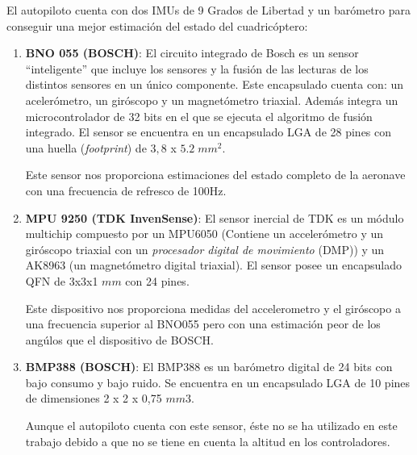 El autopiloto cuenta con dos IMUs de 9 Grados de Libertad y un barómetro para conseguir una mejor estimación del estado del cuadricóptero:

\begin{enumerate}
	\item \textbf{BNO 055 (BOSCH)}: El circuito integrado de Bosch es un sensor ``inteligente'' que incluye los sensores y la fusión de las lecturas de los distintos sensores en un único componente. Este encapsulado cuenta con: un acelerómetro, un giróscopo y un magnetómetro triaxial. Además integra un microcontrolador de 32 bits en el que se ejecuta el algoritmo de fusión integrado. El sensor se encuentra en un encapsulado LGA de 28 pines con una huella (\textit{footprint}) de $3,8$ x $5.2\; mm^2$.
	
	Este sensor nos proporciona estimaciones del estado completo de la aeronave con una frecuencia de refresco de 100Hz. 
	
	\item \textbf{MPU 9250 (TDK InvenSense)}: El sensor inercial de TDK es un módulo multichip compuesto por un MPU6050 (Contiene un accelerómetro y un giróscopo triaxial con un \textit{procesador digital de movimiento} (DMP)) y un  AK8963 (un magnetómetro digital triaxial). El sensor posee un encapsulado QFN de 3x3x1 $mm$ con 24 pines.
	
	Este dispositivo nos proporciona medidas del accelerometro y el giróscopo a una frecuencia superior al BNO055 pero con una estimación peor de los angúlos que el dispositivo de BOSCH.
	
	\item \textbf{BMP388 (BOSCH)}: El BMP388 es un barómetro digital de 24 bits con bajo consumo y bajo ruido. Se encuentra en un encapsulado LGA de 10 pines de dimensiones 2 x 2 x 0,75 $mm3$.
	
	Aunque el autopiloto cuenta con este sensor, éste no se ha utilizado en este trabajo debido a que no se tiene en cuenta la altitud en los controladores.
	
\end{enumerate}

